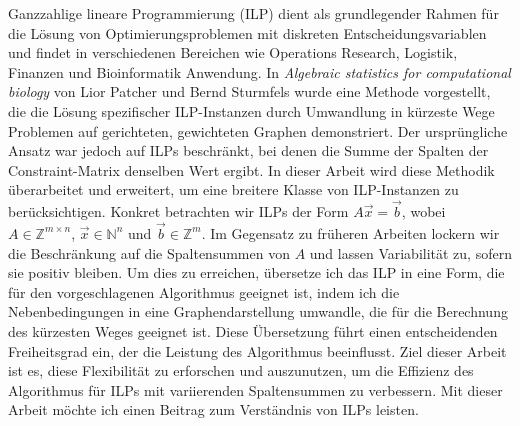 \documentclass{report}
\theoremstyle{definition}
\begin{document}
Ganzzahlige lineare Programmierung (ILP) dient als grundlegender Rahmen für die Lösung von Optimierungsproblemen mit diskreten Entscheidungsvariablen und findet in verschiedenen Bereichen wie Operations Research, Logistik, Finanzen und Bioinformatik Anwendung. In \textit{Algebraic statistics for computational biology} von Lior Patcher und Bernd Sturmfels wurde eine Methode vorgestellt, die die Lösung spezifischer ILP-Instanzen durch Umwandlung in kürzeste Wege Problemen auf gerichteten, gewichteten Graphen demonstriert. Der ursprüngliche Ansatz war jedoch auf ILPs beschränkt, bei denen die Summe der Spalten der Constraint-Matrix denselben Wert ergibt. In dieser Arbeit wird diese Methodik überarbeitet und erweitert, um eine breitere Klasse von ILP-Instanzen zu berücksichtigen. Konkret betrachten wir ILPs der Form $A\vec x = \vec b$, wobei $A\in \mathbb{Z}^{m \times n}$, $\vec x \in \mathbb{N}^n$ und $\vec b \in \mathbb{Z}^m$. Im Gegensatz zu früheren Arbeiten lockern wir die Beschränkung auf die Spaltensummen von $A$ und lassen Variabilität zu, sofern sie positiv bleiben. Um dies zu erreichen, übersetze ich das ILP in eine Form, die für den vorgeschlagenen Algorithmus geeignet ist, indem ich die Nebenbedingungen in eine Graphendarstellung umwandle, die für die Berechnung des kürzesten Weges geeignet ist. Diese Übersetzung führt einen entscheidenden Freiheitsgrad ein, der die Leistung des Algorithmus beeinflusst. Ziel dieser Arbeit ist es, diese Flexibilität zu erforschen und auszunutzen, um die Effizienz des Algorithmus für ILPs mit variierenden Spaltensummen zu verbessern. Mit dieser Arbeit möchte ich einen Beitrag zum Verständnis von ILPs leisten.



\tableofcontents





% 

\newpage
\thispagestyle{empty}
\end{document}
